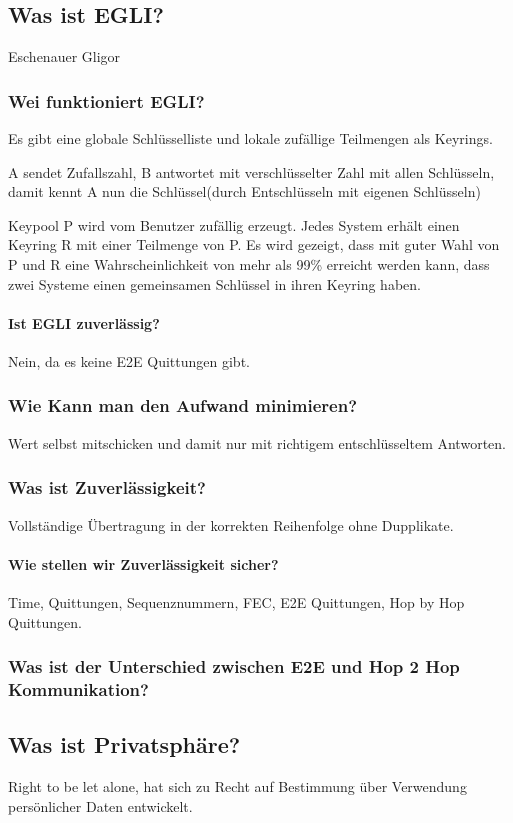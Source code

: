 	\subsection{Was ist EGLI?}
	Eschenauer Gligor
	\subsubsection{Wei funktioniert EGLI?}
	Es gibt eine globale Schlüsselliste und lokale zufällige Teilmengen als Keyrings.
	
	A sendet Zufallszahl, B antwortet mit verschlüsselter Zahl mit allen Schlüsseln, damit kennt A nun die Schlüssel(durch Entschlüsseln mit eigenen Schlüsseln) 
	
	Keypool P wird vom Benutzer zufällig erzeugt. Jedes System erhält einen Keyring R mit einer Teilmenge von P. Es wird gezeigt, dass mit guter Wahl von P und R eine Wahrscheinlichkeit von mehr als 99\% erreicht werden kann, dass zwei Systeme einen gemeinsamen Schlüssel in ihren Keyring haben. 
	\paragraph{Ist EGLI zuverlässig?}
	Nein, da es keine E2E Quittungen gibt.
	\subsubsection{Wie Kann man den Aufwand minimieren?}
	Wert selbst mitschicken und damit nur mit richtigem entschlüsseltem Antworten.
	
	\subsubsection{Was ist Zuverlässigkeit?}
	Vollständige Übertragung in der korrekten Reihenfolge ohne Dupplikate.
	\paragraph{Wie stellen wir Zuverlässigkeit sicher?}
		Time, Quittungen, Sequenznummern, FEC, E2E Quittungen, Hop by Hop Quittungen.
	\subsubsection{Was ist der Unterschied zwischen E2E und Hop 2 Hop Kommunikation?}
	
	\subsection{Was ist Privatsphäre?}
	Right to be let alone, hat sich zu Recht auf Bestimmung über Verwendung persönlicher Daten entwickelt.
